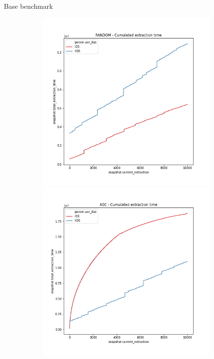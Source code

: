 \documentclass{beamer}
\begin{document}
\begin{frame}{Base benchmark}
    \begin{figure}
        \centering
        \begin{subfigure}[b]{\textwidth}
            \centering
            \includegraphics[height=0.42\textheight]{chapter4/01-basebenchmark-01-random-case.png.0-0.png}
            \includegraphics[height=0.42\textheight]{chapter4/01-basebenchmark-02-sort-a-case.png.0-0.png}

\end{subfigure}
\end{figure}
\end{frame}
\end{document}
